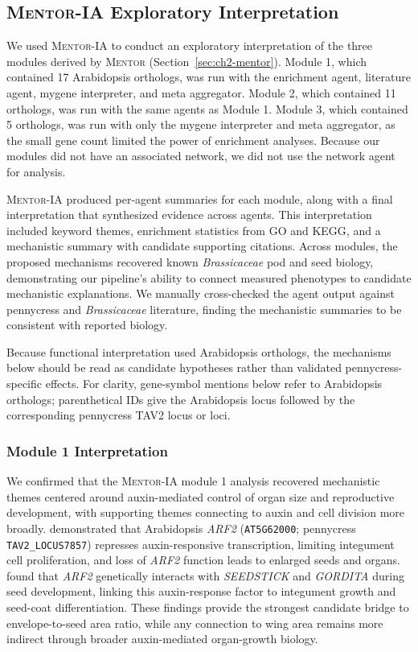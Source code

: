 \subsection{\textsc{Mentor-IA} Exploratory Interpretation}
We used \textsc{Mentor-IA} to conduct an exploratory interpretation of the three modules derived by \textsc{Mentor} (Section~\ref{sec:ch2-mentor}). Module 1, which contained 17 Arabidopsis orthologs, was run with the enrichment agent, literature agent, mygene interpreter, and meta aggregator. Module 2, which contained 11 orthologs, was run with the same agents as Module 1. Module 3, which contained 5 orthologs, was run with only the mygene interpreter and meta aggregator, as the small gene count limited the power of enrichment analyses. Because our modules did not have an associated network, we did not use the network agent for analysis.

\textsc{Mentor-IA} produced per-agent summaries for each module, along with a final interpretation that synthesized evidence across agents. This interpretation included keyword themes, enrichment statistics from GO and KEGG, and a mechanistic summary with candidate supporting citations. Across modules, the proposed mechanisms recovered known \textit{Brassicaceae} pod and seed biology, demonstrating our pipeline's ability to connect measured phenotypes to candidate mechanistic explanations. We manually cross-checked the agent output against pennycress and \textit{Brassicaceae} literature, finding the mechanistic summaries to be consistent with reported biology.

Because functional interpretation used Arabidopsis orthologs, the mechanisms below should be read as candidate hypotheses rather than validated pennycress-specific effects. For clarity, gene-symbol mentions below refer to Arabidopsis orthologs; parenthetical IDs give the Arabidopsis locus followed by the corresponding pennycress TAV2 locus or loci.

\subsubsection{Module 1 Interpretation}
We confirmed that the \textsc{Mentor-IA} module 1 analysis recovered mechanistic themes centered around auxin-mediated control of organ size and reproductive development, with supporting themes connecting to auxin and cell division more broadly. \cite{schruff2006} demonstrated that Arabidopsis \textit{ARF2} (\texttt{AT5G62000}; pennycress \texttt{TAV2\_LOCUS7857}) represses auxin-responsive transcription, limiting integument cell proliferation, and loss of \textit{ARF2} function leads to enlarged seeds and organs. \cite{paolo2021} found that \textit{ARF2} genetically interacts with \textit{SEEDSTICK} and \textit{GORDITA} during seed development, linking this auxin-response factor to integument growth and seed-coat differentiation. These findings provide the strongest candidate bridge to envelope-to-seed area ratio, while any connection to wing area remains more indirect through broader auxin-mediated organ-growth biology.

